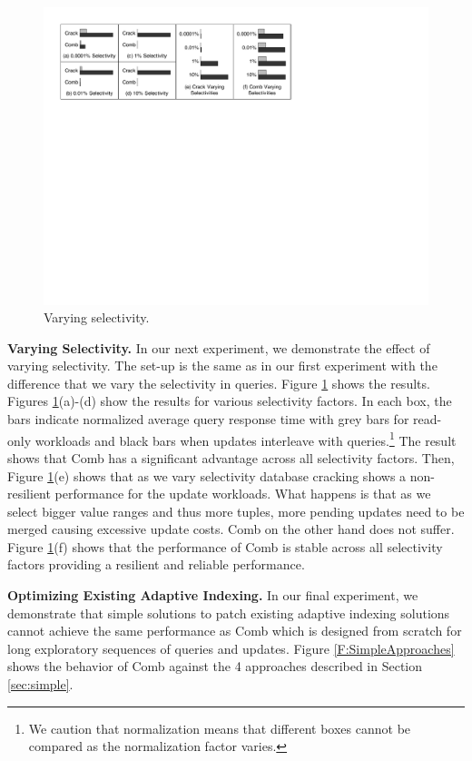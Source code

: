 \begin{figure}[t]
\includegraphics[width=\columnwidth]{graphs/selectivities.pdf}%
\vspace{-1em}%
\caption{Varying selectivity.}
\vspace{-2em}%
\label{F:Selectivity}
\end{figure}

\textbf{Varying Selectivity.}
In our next experiment, we demonstrate the effect of varying selectivity.
The set-up is the same as in our first experiment  with the difference that we vary the selectivity in queries.
Figure \ref{F:Selectivity} shows the results.
Figures \ref{F:Selectivity}(a)-(d) show the results for various selectivity factors.
In each box, the bars indicate normalized average query response time
with grey bars for read-only workloads and black bars when
updates interleave with queries.\footnote{
\small
We caution that normalization means that different boxes cannot be compared
as the normalization factor varies.
}
The result shows that Comb has a significant advantage across all selectivity factors.
Then, Figure \ref{F:Selectivity}(e) shows that as we vary selectivity database cracking shows a non-resilient performance
for the update workloads. What happens is that as we select bigger value ranges and thus more tuples, 
more pending updates need to be merged causing excessive update costs.
Comb on the other hand does not suffer. 
Figure \ref{F:Selectivity}(f) shows that the performance of 
Comb is stable across all selectivity factors providing a resilient and  reliable performance. 

\textbf{Optimizing Existing Adaptive Indexing.}
In our final experiment, we demonstrate that simple solutions to patch existing adaptive indexing
solutions cannot achieve the same performance as Comb which is designed from scratch for
long exploratory sequences of queries and updates.
Figure \ref{F:SimpleApproaches} shows the behavior of Comb against the 4 approaches described in Section \ref{sec:simple}.

